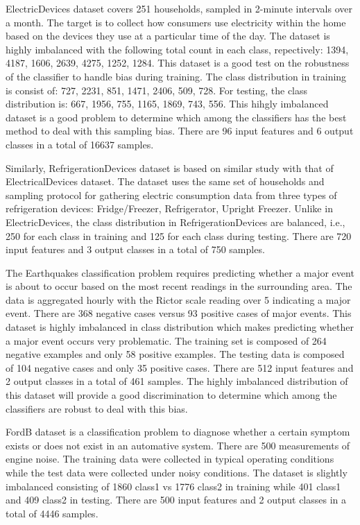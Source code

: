 \documentclass{juliacon}
\begin{document}
\vskip 6pt

ElectricDevices dataset covers 251 households, sampled in 2-minute intervals over a month. The target is to collect 
how consumers use electricity within the home based on the devices they use at a particular time of the day.  The dataset
is highly imbalanced with the following total count in each class, repectively: 1394, 4187, 1606, 2639, 4275, 1252, 1284. This dataset is a good test on the robustness of the classifier to handle bias during training. The class distribution in training is consist of: 727, 2231, 851, 1471, 2406, 509, 728. For testing, the class distribution is: 667, 1956,  755, 1165, 1869,  743,  556. This hihgly imbalanced dataset is a good problem to determine which among the classifiers has the best method to deal with this sampling bias. There are 96 input features and 6 output classes in a total of 16637  samples. \vskip 6pt

\vskip 6pt

Similarly, RefrigerationDevices dataset is based on similar study with that of ElectricalDevices dataset. The dataset uses the same set of households and sampling protocol for gathering electric consumption data from three types of refrigeration devices: Fridge/Freezer, Refrigerator, Upright Freezer. Unlike in ElectricDevices, the class distribution in RefrigerationDevices are balanced, i.e., 250 for each class in training and 125 for each class during testing. There are 720 input features and 3 output classes in a total of 
750 samples.

\vskip 6pt

The Earthquakes classification problem requires predicting whether a major event is about to occur based on the most recent readings in the surrounding area. The data is aggregated hourly with the Rictor scale reading over 5 indicating a  major event. There are 368 negative cases versus 93 positive cases of major events. This dataset is highly imbalanced in class distribution which makes predicting whether a major event occurs very problematic. The training set is composed of 264 negative examples and only 58 positive examples. The testing data is composed of 104 negative cases and only 35 positive cases.
There are 512 input features and 2 output classes in a total of 461 samples. The highly imbalanced distribution of this dataset will provide a good discrimination to determine which among the classifiers are robust to deal with this bias.

\vskip 6pt

FordB dataset is a classification problem to diagnose whether a certain symptom exists or does not exist in an automative system. There are 500 measurements of engine noise. The training data were collected in typical operating conditions while the test data were collected under noisy conditions. The dataset is slightly imbalanced consisting of 1860 class1 vs 1776 class2 in training while 401 class1 and 409 class2 in testing. There are 500 input features and 2 output classes in a total of 4446 samples.
\end{document}
